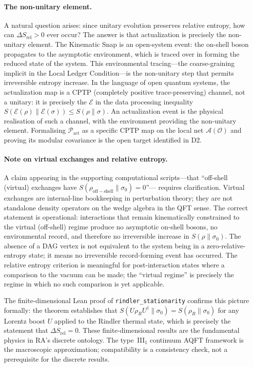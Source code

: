 \documentclass[11pt,a4paper]{article}
\theoremstyle{plain}
\theoremstyle{definition}
\theoremstyle{remark}
\newcommand{\Pact}{\mathcal{P}_{\mathrm{act}}}
\begin{document}
\paragraph{The non-unitary element.}
A natural question arises: since unitary evolution preserves relative entropy,
how can $\Delta S_{\mathrm{rel}} > 0$ ever occur? The answer is that actualization
is precisely the non-unitary element. The Kinematic Snap is an open-system event:
the on-shell boson propagates to the asymptotic environment, which is traced over
in forming the reduced state of the system. This environmental tracing---the
coarse-graining implicit in the Local Ledger Condition---is the non-unitary
step that permits irreversible entropy increase. In the language of open quantum
systems, the actualization map is a CPTP (completely positive trace-preserving)
channel, not a unitary: it is precisely the $\mathcal{E}$ in the data processing
inequality $S(\mathcal{E}(\rho) \| \mathcal{E}(\sigma)) \leq S(\rho \| \sigma)$.
An actualization event is the physical realisation of such a channel, with the
environment providing the non-unitary element. Formalising $\Pact$ as a specific
CPTP map on the local net $\mathcal{A}(\mathcal{O})$ and proving its modular
covariance is the open target identified in D2.

\paragraph{Note on virtual exchanges and relative entropy.}
A claim appearing in the supporting computational scripts---that ``off-shell
(virtual) exchanges have $S(\rho_{\mathrm{off-shell}} \| \sigma_0) = 0$''---
requires clarification. Virtual exchanges are internal-line bookkeeping
in perturbation theory; they are not standalone density operators on the
wedge algebra in the QFT sense. The correct statement is operational: interactions
that remain kinematically constrained to the virtual (off-shell) regime produce
no asymptotic on-shell bosons, no environmental record, and therefore no
irreversible increase in $S(\rho \| \sigma_0)$. The absence of a DAG vertex
is not equivalent to the system being in a zero-relative-entropy state; it means
no irreversible record-forming event has occurred. The relative entropy criterion
is meaningful for post-interaction states where a comparison to the vacuum can be
made; the ``virtual regime'' is precisely the regime in which no such comparison
is yet applicable.

The finite-dimensional Lean proof of \texttt{rindler\_stationarity} confirms this
picture formally: the theorem establishes that $S(U\rho_R U^\dagger \| \sigma_0) =
S(\rho_R \| \sigma_0)$ for any Lorentz boost $U$ applied to the Rindler thermal
state, which is precisely the statement that $\Delta S_{\mathrm{rel}} = 0$.
These finite-dimensional results are the fundamental physics in RA's
discrete ontology. The type~III$_1$ continuum AQFT framework is the
macroscopic approximation; compatibility is a consistency check, not a
prerequisite for the discrete results.
\end{document}
